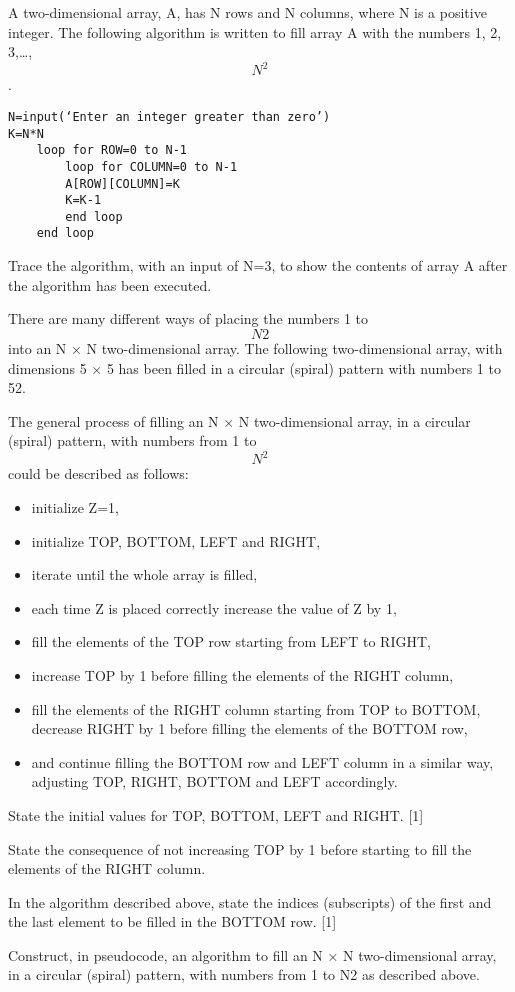\begin{exercise*}%
A two-dimensional array, A, has N rows and N columns, where N is a positive integer.
The following algorithm is written to fill array A with the numbers 1, 2, 3,…, $$N^2$$.
\begin{verbatim}
N=input(‘Enter an integer greater than zero’)
K=N*N
	loop for ROW=0 to N-1
		loop for COLUMN=0 to N-1
		A[ROW][COLUMN]=K
		K=K-1
		end loop
	end loop
\end{verbatim}
\begin{parts}
\item Trace the algorithm, with an input of N=3, to show the contents of array A after the algorithm has been executed.
\end{parts}
There are many different ways of placing the numbers 1 to $$N2$$ into an N × N two-dimensional array. 
The following two-dimensional array, with dimensions 5 × 5 has been filled in a circular (spiral) pattern with numbers 1 to 52.

The general process of filling an N × N two-dimensional array, in a circular (spiral) pattern, with numbers from 1 to $$N^2$$ could be described as follows:

\begin{itemize}
\item initialize Z=1,
\item initialize TOP, BOTTOM, LEFT and RIGHT,
\item iterate until the whole array is filled,
\item each time Z is placed correctly increase the value of Z by 1,
\item fill the elements of the TOP row starting from LEFT to RIGHT,
\item increase TOP by 1 before filling the elements of the RIGHT column,
\item fill the elements of the RIGHT column starting from TOP to BOTTOM,
\itm decrease RIGHT by 1 before filling the elements of the BOTTOM row,
\item and continue filling the BOTTOM row and LEFT column in a similar way, adjusting TOP, RIGHT, BOTTOM and LEFT accordingly.
\end{itemize}

\begin{parts}
\item State the initial values for TOP, BOTTOM, LEFT and RIGHT. [1]
\item State the consequence of not increasing TOP by 1 before starting to fill the elements of the RIGHT column.
\item In the algorithm described above, state the indices (subscripts) of the first and the last element to be filled in the BOTTOM row. [1]
\item Construct, in pseudocode, an algorithm to fill an N × N two-dimensional array, in a circular (spiral) pattern, with numbers from 1 to N2 as described above.
\end{parts}
\end{exercise*}